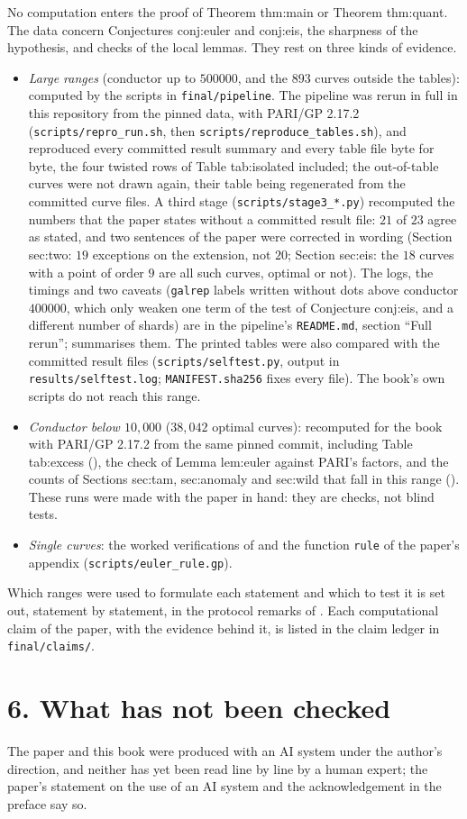 No computation enters the proof of Theorem thm:main or Theorem thm:quant. The data concern Conjectures conj:euler and
conj:eis, the sharpness of the hypothesis, and checks of the local lemmas. They rest on three kinds of evidence.
\begin{itemize}[leftmargin=*]
\item \emph{Large ranges} (conductor up to $500000$, and the $893$ curves outside the tables): computed by the scripts in
\texttt{final/pipeline}. The pipeline was rerun in full in this repository from the pinned data, with PARI/GP 2.17.2
(\texttt{scripts/\allowbreak repro\_run.sh}, then \texttt{scripts/\allowbreak reproduce\_tables.sh}), and reproduced every committed result
summary and every table file byte for byte, the four twisted rows of Table tab:isolated included; the out-of-table curves
were not drawn again, their table being regenerated from the committed curve files. A third stage
(\texttt{scripts/stage3\_*.py}) recomputed the numbers that the paper states without a committed result file: $21$ of $23$
agree as stated, and two sentences of the paper were corrected in wording (Section sec:two: $19$ exceptions on the
extension, not $20$; Section sec:eis: the $18$ curves with a point of order $9$ are all such curves, optimal or not). The
logs, the timings and two caveats (\texttt{galrep} labels written without dots above conductor $400000$, which only weaken
one term of the test of Conjecture conj:eis, and a different number of shards) are in the pipeline's \texttt{README.md},
section ``Full rerun'';  summarises them. The printed tables were also compared with the committed
result files (\texttt{scripts/selftest.py}, output in \texttt{results/selftest.log}; \texttt{MANIFEST.sha256} fixes every
file). The book's own scripts do not reach this range.
\item \emph{Conductor below $10{,}000$} ($38{,}042$ optimal curves): recomputed for the book with PARI/GP 2.17.2 from the
same pinned commit, including Table tab:excess (), the check of Lemma lem:euler against PARI's factors,
and the counts of Sections sec:tam, sec:anomaly and sec:wild that fall in this range (). These runs were
made with the paper in hand: they are checks, not blind tests.
\item \emph{Single curves}: the worked verifications of  and the function \texttt{rule} of the paper's
appendix (\texttt{scripts/euler\_rule.gp}).
\end{itemize}
Which ranges were used to formulate each statement and which to test it is set out, statement by statement, in the
protocol remarks of . Each computational claim of the paper,
with the evidence behind it, is listed in the claim ledger in \texttt{final/claims/}.

\section*{6. What has not been checked}

The paper and this book were produced with an AI system under the author's direction, and neither has yet been read line
by line by a human expert; the paper's statement on the use of an AI system and the acknowledgement in the preface say so.
